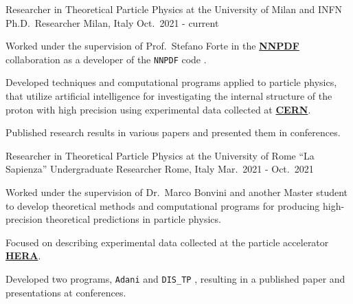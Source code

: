

\begin{cventries}

  \cventry
  {Researcher in Theoretical Particle Physics at the University of Milan and INFN}
  {Ph.D.\ Researcher}
  {Milan, Italy}
  {Oct.\ 2021 - current}
  {
      \begin{cvitems} %
          \item Worked under the supervision of Prof.\ Stefano Forte in the \href{https://nnpdf.mi.infn.it}{\textbf{NNPDF}} collaboration 
          as a developer of the \texttt{NNPDF} code \href{https://github.com/NNPDF}{\faGithubSquare}.
          \item Developed techniques and computational programs applied to particle physics, that utilize artificial intelligence for 
          investigating the internal structure of the proton with high precision using experimental data collected at \href{https://home.cern}{\textbf{CERN}}.
          \item Published research results in various papers and presented them in conferences.
      \end{cvitems}
    }

    \cventry
{Researcher in Theoretical Particle Physics at the University of Rome ``La Sapienza''}
{Undergraduate Researcher}
{Rome, Italy}
{Mar.\ 2021 - Oct.\ 2021}
{
      \begin{cvitems} %
        \item Worked under the supervision of Dr.\ Marco Bonvini and another Master student to develop theoretical methods and computational programs for producing high-precision theoretical predictions in particle physics.
        \item Focused on describing experimental data collected at the particle accelerator \href{https://en.wikipedia.org/wiki/HERA_(particle_accelerator)}{\textbf{HERA}}.
        \item Developed two programs, \texttt{Adani} \href{https://github.com/niclaurenti/adani}{\faGithubSquare} and \texttt{DIS\_TP} \href{https://github.com/andreab1997/DIS_TP}{\faGithubSquare}, resulting in a published paper and presentations at conferences.
      \end{cvitems}
    }


\end{cventries}